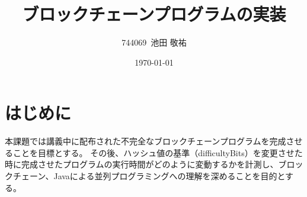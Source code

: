 \documentclass[uplatex, twocolumn,10pt]{jsarticle}
\title{ブロックチェーンプログラムの実装}
\author{744069\ 池田 敬祐}
\date{\today}
\begin{document}

\section{はじめに}
本課題では講義中に配布された不完全なブロックチェーンプログラムを完成させることを目標とする。
その後、ハッシュ値の基準（difficultyBits）を変更させた時に完成させたプログラムの実行時間がどのように変動するかを計測し、ブロックチェーン、Javaによる並列プログラミングへの理解を深めることを目的とする。
\end{document}
